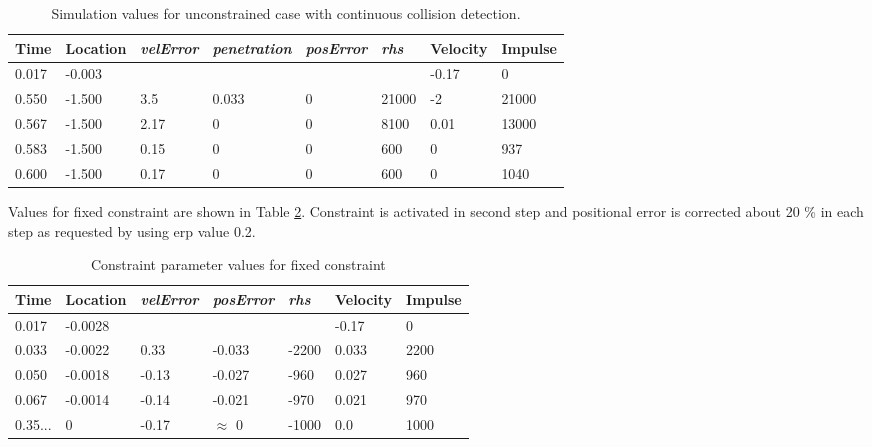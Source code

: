 \begin {table}[htb!]
\caption {Simulation values for unconstrained case with continuous collision detection. } 
\label{tab:freeBlockValuesWithCcd} 
\begin{center}
\begin{tabular}{|l| l|l| l|l|l|l|l|}
\hline
{\bf Time} & 
{\bf Location} &
{\it velError} & {\it penetration} & {\it posError} & {\it rhs} &
{\bf Velocity} & 
{\bf Impulse} \\  \hline
0.017 &  -0.003 & & & &  &-0.17 & 0 \\  \hline
0.550 &  -1.500 & 3.5 & 0.033 & 0 & 21000& -2 & 21000 \\  \hline
0.567 &  -1.500 & 2.17 & 0 & 0  &  8100 & 0.01 & 13000 \\  \hline
0.583 &  -1.500 & 0.15 & 0 & 0 & 600  & 0 & 937 \\  \hline
0.600 &  -1.500 & 0.17 & 0 & 0 & 600  & 0 & 1040 \\  \hline
\end {tabular}
\end{center}
\end {table}

Values for fixed constraint are shown in Table
\ref{tab:fixedBlockValues}. Constraint is activated in second step and positional error is corrected
about 20 \% in each step as requested by using erp value 0.2.

\begin {table}[htb!]
\caption {Constraint parameter values for fixed constraint} 
\label{tab:fixedBlockValues} 
\begin{center}
\begin{tabular}{|l|l| l| l|l|l|l|}
\hline
{\bf Time} & 
{\bf Location} &
{\it velError} & {\it posError} & {\it rhs} &
{\bf Velocity} & 
{\bf Impulse} \\  \hline
0.017 & -0.0028 &  & & & -0.17 & 0 \\  \hline
0.033 & -0.0022 & 0.33 & -0.033 & -2200 & 0.033 & 2200 \\  \hline
0.050 & -0.0018 & -0.13 & -0.027 & -960 & 0.027 & 960 \\  \hline
0.067 & -0.0014 &-0.14 & -0.021 & -970 & 0.021 & 970 \\  \hline
0.35... & 0 &-0.17 & $\approx$ 0 & -1000 &0.0 & 1000 \\  \hline
\end {tabular}
\end{center}
\end {table}

